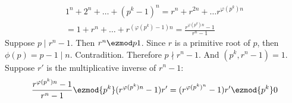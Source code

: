 \begin{enumerate}[label=\ilabel]
        \begin{gather*}
            1^n + 2^n + \dots + (p^k - 1)^n = r^n + r^{2n} + \dots r^{\varphi(p^k)n} \\= 1 + r^n + \dots + r^{(\varphi(p^k) - 1)n} 
            = \frac{r^{\varphi(p^k)n} - 1}{r^n - 1}
        \end{gather*}
        Suppose $p \mid r^n - 1$. Then $r^n \ezmod p 1$. Since $r$ is a primitive root of $p$, then $\phi(p) = p - 1 \mid n$. Contradition. Therefore $p \nmid r^n - 1$. And $(p^k, r^n - 1) = 1$. Suppose $r'$ is the multiplicative inverse of $r^n - 1$:
        \begin{gather*}
            \frac{r^{\varphi(p^k)n} - 1}{r^n - 1} \ezmod{p^k} (r^{\varphi(p^k)n} - 1)r' = (r^{\varphi(p^k)^n} - 1) r' \ezmod{p^k} 0
        \end{gather*} 
\end{enumerate}